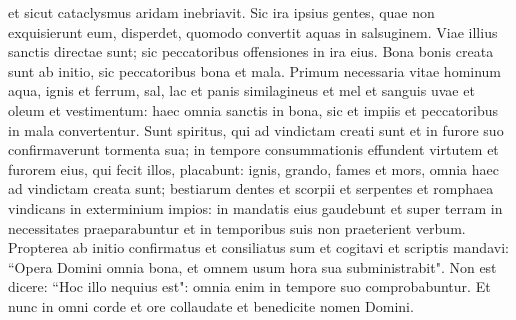 \begin{biblechapter}
\verse et sicut cataclysmus aridam inebriavit. Sic ira ipsius gentes, quae non exquisierunt eum, disperdet, 
\verse quomodo convertit aquas in salsuginem. Viae illius sanctis directae sunt; sic peccatoribus offensiones in ira eius. 
\verse Bona bonis creata sunt ab initio, sic peccatoribus bona et mala. 
\verse Primum necessaria vitae hominum aqua, ignis et ferrum, sal, lac et panis similagineus et mel et sanguis uvae et oleum et vestimentum: 
\verse haec omnia sanctis in bona, sic et impiis et peccatoribus in mala convertentur. 
\verse Sunt spiritus, qui ad vindictam creati sunt et in furore suo confirmaverunt tormenta sua; 
\verse in tempore consummationis effundent virtutem et furorem eius, qui fecit illos, placabunt: 
\verse ignis, grando, fames et mors, omnia haec ad vindictam creata sunt; 
\verse bestiarum dentes et scorpii et serpentes et romphaea vindicans in exterminium impios: 
\verse in mandatis eius gaudebunt et super terram in necessitates praeparabuntur et in temporibus suis non praeterient verbum. 
\verse Propterea ab initio confirmatus et consiliatus sum et cogitavi et scriptis mandavi: 
\verse “Opera Domini omnia bona, et omnem usum hora sua subministrabit". 
\verse Non est dicere: “Hoc illo nequius est": omnia enim in tempore suo comprobabuntur. 
\verse Et nunc in omni corde et ore collaudate et benedicite nomen Domini. 
\end{biblechapter}

